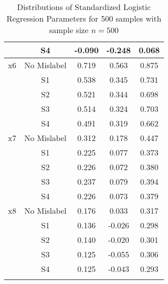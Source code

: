 \documentclass{article}
\begin{document}
\begin{longtable}{c c c c c}
&S4&-0.090&-0.248&0.068\\
\midrule
x6&No Mislabel&0.719&0.563&0.875\\
&S1&0.538&0.345&0.731\\
&S2&0.521&0.344&0.698\\
&S3&0.514&0.324&0.703\\
&S4&0.491&0.319&0.662\\
\midrule
x7&No Mislabel&0.312&0.178&0.447\\
&S1&0.225&0.077&0.373\\
&S2&0.226&0.072&0.380\\
&S3&0.237&0.079&0.394\\
&S4&0.226&0.073&0.379\\
\midrule
x8&No Mislabel&0.176&0.033&0.317\\
&S1&0.136&-0.026&0.298\\
&S2&0.140&-0.020&0.301\\
&S3&0.125&-0.055&0.306\\
&S4&0.125&-0.043&0.293\\
\bottomrule
\caption{Distributions of Standardized Logistic Regression Parameters for 500 samples with sample size $n=500$}\label{simresult}
\end{longtable}
\end{document}
